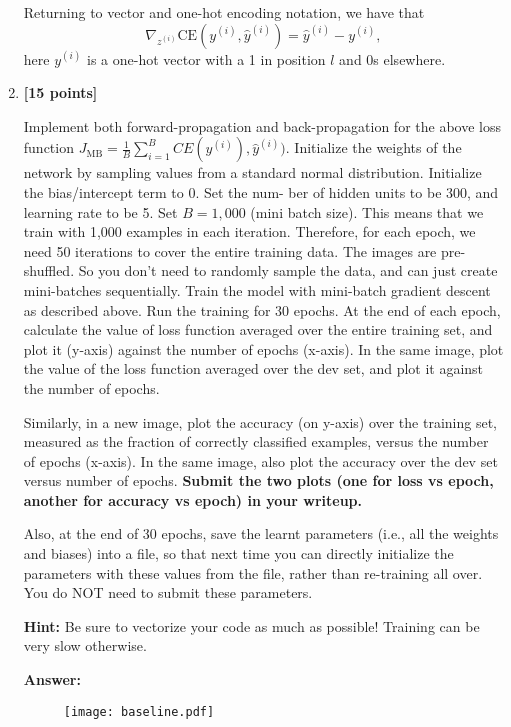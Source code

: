 \documentclass{article}
\begin{document}
\begin{enumerate}[label=(\alph*)]
Returning to vector and one-hot encoding notation, we have that
\[
\nabla_{z^{(i)}}\text{CE}( y^{(i)}, \hat{y}^{(i)}) = \hat{y}^{(i)} - y^{(i)},
\]
here $y^{(i)}$ is a one-hot vector with a 1 in position 
$l$ and 0s elsewhere.



\item \textbf{[15 points]} 

Implement both forward-propagation and back-propagation for the above loss function $ J_{\text{MB}} = \frac{1}{B}\sum_{i=1}^{B} CE(y^{(i)}), \hat{y}^{(i)})$. Initialize the weights of the network by sampling values from a standard normal distribution. Initialize the bias/intercept term to 0. Set the num- ber of hidden units to be 300, and learning rate to be 5. Set $B = 1,000$ (mini batch size). This means that we train with 1,000 examples in each iteration. Therefore, for each epoch, we need 50 iterations to cover the entire training data. The images are pre-shuffled. So you don’t need to randomly sample the data, and can just create mini-batches sequentially. Train the model with mini-batch gradient descent as described above. Run the training for 30 epochs. At the end of each epoch, calculate the value of loss function averaged over the entire training set, and plot it (y-axis) against the number of epochs (x-axis). In the same image, plot the value of the loss function averaged over the dev set, and plot it against the number of epochs.

Similarly, in a new image, plot the accuracy (on y-axis) over the training set, measured as the fraction of correctly classified examples, versus the number of epochs (x-axis). In the same image, also plot the accuracy over the dev set versus number of epochs.
\textbf{Submit the two plots (one for loss vs epoch, another for accuracy vs epoch) in your writeup.}

Also, at the end of 30 epochs, save the learnt parameters (i.e., all the weights and biases) into a file, so that next time you can directly initialize the parameters with these values from the file, rather than re-training all over. You do NOT need to submit these parameters. 

\textbf{Hint:} Be sure to vectorize your code as much as possible! Training can be very slow otherwise.

\textbf{Answer:}


\begin{figure}[H]
    \centering
    \texttt{[image: baseline.pdf]}
    \label{fig:baseline}
\end{figure}



\end{enumerate}
\end{document}
